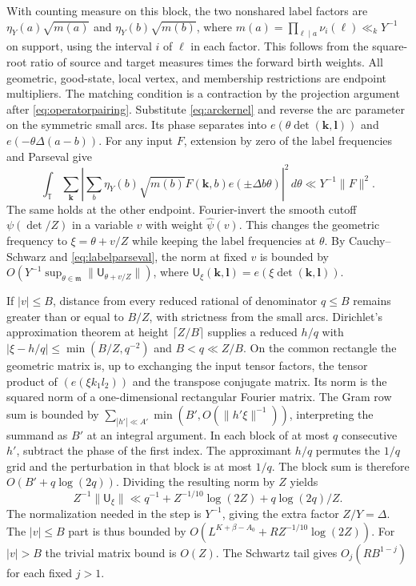 \documentclass[11pt]{amsart}
\numberwithin{equation}{section}
\theoremstyle{remark}
\begin{document}
With counting measure on this block, the two nonshared label factors
are $\eta_Y(a)\sqrt{m(a)}$ and $\eta_Y(b)\sqrt{m(b)}$, where
$m(a)=\prod_{\ell\mid a}\nu_i(\ell)\ll_k Y^{-1}$ on support, using the
interval $i$ of $\ell$ in each factor. This follows from the square-root
ratio of source and target measures times the forward birth weights.
All geometric, good-state, local vertex, and membership restrictions
are endpoint multipliers. The matching condition is a contraction by
the projection argument after \eqref{eq:operatorpairing}.
Substitute \eqref{eq:arckernel} and reverse the arc parameter on the
symmetric small arcs. Its phase separates into
$e(\theta\det(\mathbf k,\mathbf l))$ and $e(-\theta\Delta(a-b))$.
For any input $F$, extension by zero of the label frequencies and
Parseval give
\begin{equation}\label{eq:labelparseval}
 \int_{\mathbb T}\sum_{\mathbf k}
 \left|\sum_b \eta_Y(b)\sqrt{m(b)}F(\mathbf k,b)
             e(\pm\Delta b\theta)\right|^2\,d\theta
 \ll Y^{-1}\|F\|^2.
\end{equation}
The same holds at the other endpoint. Fourier-invert the smooth
cutoff $\psi(\det/Z)$ in a variable $v$ with weight $\widehat\psi(v)$.
This changes the geometric frequency to $\xi=\theta+v/Z$ while
keeping the label frequencies at $\theta$. By Cauchy--Schwarz and
\eqref{eq:labelparseval}, the norm at fixed $v$ is bounded by
$O(Y^{-1}\sup_{\theta\in\mathfrak m}\|\mathsf U_{\theta+v/Z}\|)$,
where $\mathsf U_\xi(\mathbf k,\mathbf l)=e(\xi\det(\mathbf k,\mathbf l))$.

If $|v|\le B$, distance from every reduced rational of denominator
$q\le B$ remains greater than or equal to $B/Z$, with strictness
from the small arcs. Dirichlet's approximation theorem at height
$\lceil Z/B\rceil$ supplies a reduced $h/q$ with
$|\xi-h/q|\le\min(B/Z,q^{-2})$ and $B<q\ll Z/B$.
On the common rectangle the geometric matrix is, up to exchanging
the input tensor factors, the tensor product of
$(e(\xi k_1l_2))$ and the transpose conjugate matrix. Its norm is
the squared norm of a one-dimensional rectangular Fourier matrix.
The Gram row sum is bounded by
$\sum_{|h'|\ll A'}\min(B',O(\|h'\xi\|^{-1}))$, interpreting the
summand as $B'$ at an integral argument. In each block of at most
$q$ consecutive $h'$, subtract the phase of the first index. The
approximant $h/q$ permutes the $1/q$ grid and the perturbation in
that block is at most $1/q$. The block sum is therefore
$O(B'+q\log(2q))$. Dividing the resulting norm by $Z$ yields
\begin{equation}\label{eq:geometryfourier}
 Z^{-1}\|\mathsf U_\xi\|\ll
 q^{-1}+Z^{-1/10}\log(2Z)+q\log(2q)/Z.
\end{equation}
The normalization needed in the step is $Y^{-1}$, giving the extra
factor $Z/Y=\Delta$. The $|v|\le B$ part is thus bounded by
$O(L^{K+\beta-A_0}+R Z^{-1/10}\log(2Z))$. For $|v|>B$ the trivial
matrix bound is $O(Z)$. The Schwartz tail gives $O_j(RB^{1-j})$
for each fixed $j>1$.
\end{document}
